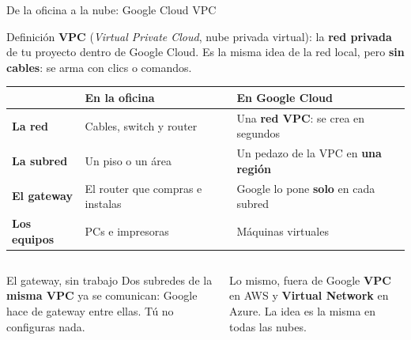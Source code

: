 \documentclass[aspectratio=169,10pt,c]{beamer}
\begin{document}
\begin{frame}{De la oficina a la nube: Google Cloud VPC}
\begin{block}{Definición}
\small \textbf{VPC} (\emph{Virtual Private Cloud}, nube privada virtual): la \textbf{red privada} de tu proyecto dentro de Google Cloud. Es la misma idea de la red local, pero \textbf{sin cables}: se arma con clics o comandos.
\end{block}
\renewcommand{\arraystretch}{1.3}
\centering\small
\begin{tabular}{@{}p{3.0cm}p{4.5cm}p{5.4cm}@{}}
\toprule
 & \textbf{En la oficina} & \textbf{En Google Cloud}\\
\midrule
\textbf{La red} & Cables, switch y router & Una \textbf{red VPC}: se crea en segundos\\
\textbf{La subred} & Un piso o un área & Un pedazo de la VPC en \textbf{una región}\\
\textbf{El gateway} & El router que compras e instalas & Google lo pone \textbf{solo} en cada subred\\
\textbf{Los equipos} & PCs e impresoras & Máquinas virtuales\\
\bottomrule
\end{tabular}
\par\vspace{2mm}
\begin{columns}[T,onlytextwidth]
\begin{exampleblock}{El gateway, sin trabajo}
\small Dos subredes de la \textbf{misma VPC} ya se comunican: Google hace de gateway entre ellas. Tú no configuras nada.
\end{exampleblock}
\begin{alertblock}{Lo mismo, fuera de Google}
\small \textbf{VPC} en AWS y \textbf{Virtual Network} en Azure. La idea es la misma en todas las nubes.
\end{alertblock}
\end{columns}
\end{frame}
\end{document}
